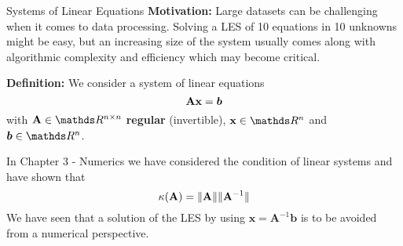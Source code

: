 \documentclass[11pt,compress,t,notes=noshow, xcolor=table]{beamer}
\begin{document}
\begin{vbframe}{Systems of Linear Equations}
\textbf{Motivation:}
Large datasets can be challenging when it comes to data processing. Solving a LES of 10 equations in 10 unknowns might be easy, but an increasing size of the system usually comes along with algorithmic complexity and efficiency which may become critical.

\lz
\vspace*{-0.1cm}
\textbf{Definition:}
We consider a system of linear equations 
\vspace*{-0.1cm}
$$
\mathbf{A} \mathbf{x} = \boldsymbol{b}
$$
\vspace*{-0.1cm}
with $\Amat \in \R^{n \times n}$ \textbf{regular} (invertible), $\xv \in \R^n$ and $\boldsymbol{b} \in \R^n$.

\lz

In Chapter 3 - Numerics we have considered the condition of linear systems and have shown that
\vspace*{-0.2cm}
$$
\kappa(\mathbf{A}) = \|\mathbf{A}\|\|\mathbf{A}^{-1}\|
$$
We have seen that a solution of the LES by using $\bm{x} = \bm{A}^{-1}\bm{b}$ is to be avoided from a numerical perspective. 






\end{vbframe}
\end{document}
